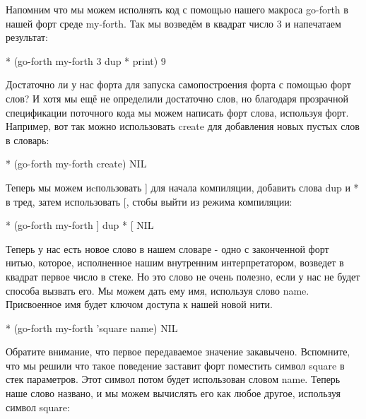 Напомним что мы можем исполнять код с помощью нашего макроса go-forth в нашей форт среде my-forth. Так мы возведём в квадрат число 3 и напечатаем результат:

* (go-forth my-forth
3 dup * print)
9

Достаточно ли у нас форта для запуска самопостроения форта с помощью форт слов? И хотя мы ещё не определили достаточно слов, но благодаря прозрачной спецификации поточного кода мы можем написать форт слова, используя форт. Например, вот так можно использовать create для добавления новых пустых слов в словарь:

* (go-forth my-forth
create)
NIL

Теперь мы можем иcпользовать ] для начала компиляции, добавить слова dup и * в тред, затем использовать [, стобы выйти из режима компиляции:

* (go-forth my-forth
] dup * [
NIL

Теперь у нас есть новое слово в нашем словаре - одно с законченной форт нитью, которое, исполненное нашим внутренним интерпретатором, возведет в квадрат первое число в стеке. Но это слово не очень полезно, если у нас не будет способа вызвать его. Мы можем дать ему имя, используя слово name. Присвоенное имя будет ключом доступа к нашей новой нити.

* (go-forth my-forth
’square name)
NIL

Обратите внимание, что первое передаваемое значение закавычено. Вспомните, что мы решили что такое поведение заставит форт поместить символ square в стек параметров. Этот символ потом будет использован словом name. Теперь наше слово названо, и мы можем вычислять его как любое другое, используя символ square: 


